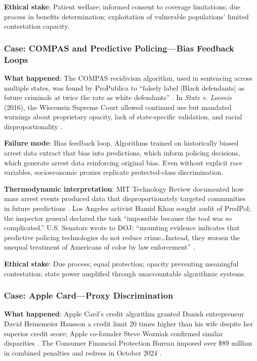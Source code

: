 \textbf{Ethical stake}: Patient welfare; informed consent to coverage limitations; due process in benefits determination; exploitation of vulnerable populations' limited contestation capacity.

\subsubsection{Case: COMPAS and Predictive Policing---Bias Feedback Loops}

\textbf{What happened}: The COMPAS recidivism algorithm, used in sentencing across multiple states, was found by ProPublica to ``falsely label [Black defendants] as future criminals at twice the rate as white defendants'' \citep{propublica2016compas}. In \textit{State v. Loomis} (2016), the Wisconsin Supreme Court allowed continued use but mandated warnings about proprietary opacity, lack of state-specific validation, and racial disproportionality \citep{wisconsin2016loomis}.

\textbf{Failure mode}: Bias feedback loop. Algorithms trained on historically biased arrest data extract that bias into predictions, which inform policing decisions, which generate arrest data reinforcing original bias. Even without explicit race variables, socioeconomic proxies replicate protected-class discrimination.

\textbf{Thermodynamic interpretation}: MIT Technology Review documented how mass arrest events produced data that disproportionately targeted communities in future predictions \citep{mittechreview2020}. Los Angeles activist Hamid Khan sought audit of PredPol; the inspector general declared the task ``impossible because the tool was so complicated.'' U.S. Senators wrote to DOJ: ``mounting evidence indicates that predictive policing technologies do not reduce crime\ldots Instead, they worsen the unequal treatment of Americans of color by law enforcement'' \citep{senate2024predictive}.

\textbf{Ethical stake}: Due process; equal protection; opacity preventing meaningful contestation; state power amplified through unaccountable algorithmic systems.

\subsubsection{Case: Apple Card---Proxy Discrimination}

\textbf{What happened}: Apple Card's credit algorithm granted Danish entrepreneur David Heinemeier Hansson a credit limit 20 times higher than his wife despite her superior credit score; Apple co-founder Steve Wozniak confirmed similar disparities \citep{bbc2019apple}. The Consumer Financial Protection Bureau imposed over \$89 million in combined penalties and redress in October 2024 \citep{cfpb2024apple}.

